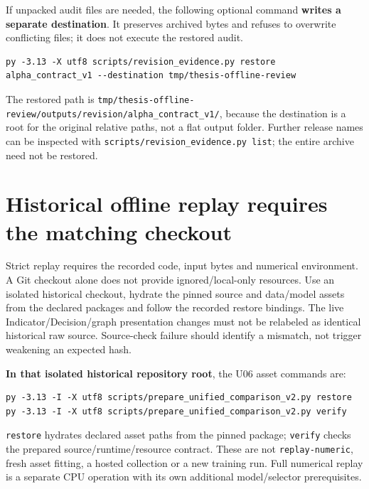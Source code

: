 If unpacked audit files are needed, the following optional command
\textbf{writes a separate destination}. It preserves archived bytes and refuses
to overwrite conflicting files; it does not execute the restored audit.

\begin{Verbatim}[fontsize=\small,breaklines=true,breakanywhere=true]
py -3.13 -X utf8 scripts/revision_evidence.py restore alpha_contract_v1 --destination tmp/thesis-offline-review
\end{Verbatim}

The restored path is
\texttt{tmp/\allowbreak{}thesis-\allowbreak{}offline-\allowbreak{}review/\allowbreak{}outputs/\allowbreak{}revision/\allowbreak{}alpha\_\allowbreak{}contract\_\allowbreak{}v1/\allowbreak{}}, because
the destination is a root for the original relative paths, not a flat
output folder. Further release names can be inspected with
\texttt{scripts/\allowbreak{}revision\_\allowbreak{}evidence.\allowbreak{}py list}; the entire archive need not be restored.

\section{Historical offline replay requires the matching checkout}\label{s:0deff24ffc15238d}

Strict replay requires the recorded code, input bytes and numerical
environment. A Git checkout alone does not provide ignored/local-only
resources. Use an isolated historical checkout, hydrate the pinned source
and data/model assets from the declared packages and follow the recorded
restore bindings. The live Indicator/Decision/graph presentation changes
must not be relabeled as identical historical raw source. Source-check
failure should identify a mismatch, not trigger weakening an expected hash.

\textbf{In that isolated historical repository root}, the U06 asset commands are:

\begin{Verbatim}[fontsize=\small,breaklines=true,breakanywhere=true]
py -3.13 -I -X utf8 scripts/prepare_unified_comparison_v2.py restore
py -3.13 -I -X utf8 scripts/prepare_unified_comparison_v2.py verify
\end{Verbatim}

\texttt{restore} hydrates declared asset paths from the pinned package; \texttt{verify}
checks the prepared source/runtime/resource contract. These are not
\texttt{replay-\allowbreak{}numeric}, fresh asset fitting, a hosted collection or a new
training run. Full numerical replay is a separate CPU operation with its
own additional model/selector prerequisites.


